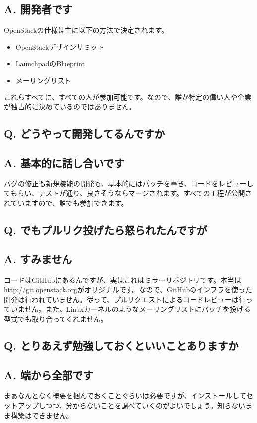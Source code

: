 \documentclass[9pt,b5paper,tombo,openany]{jsbook}
\begin{document}
\subsection*{{\LARGE\bfseries A.} 開発者です}
OpenStackの仕様は主に以下の方法で決定されます。
\begin{itemize}
	\item OpenStackデザインサミット
	\item LaunchpadのBlueprint
	\item メーリングリスト
\end{itemize}
これらすべてに、すべての人が参加可能です。なので、誰か特定の偉い人や企業が独占的に決めているのではありません。

\subsection*{{\LARGE\bfseries Q.} どうやって開発してるんですか}
\subsection*{{\LARGE\bfseries A.} 基本的に話し合いです}
バグの修正も新規機能の開発も、基本的にはパッチを書き、コードをレビューしてもらい、テストが通り、良さそうならマージされます。すべての工程が公開されていますので、誰でも参加できます。

\subsection*{{\LARGE\bfseries Q.} でもプルリク投げたら怒られたんですが}
\subsection*{{\LARGE\bfseries A.} すみません}
コードはGitHubにあるんですが、実はこれはミラーリポジトリです。本当は\url{http://git.openstack.org}がオリジナルです。なので、GitHubのインフラを使った開発は行われていません。従って、プルリクエストによるコードレビューは行っていません。また、Linuxカーネルのようなメーリングリストにパッチを投げる型式でも取り合ってくれません。

\subsection*{{\LARGE\bfseries Q.} とりあえず勉強しておくといいことありますか}
\subsection*{{\LARGE\bfseries A.} 端から全部です}
まぁなんとなく概要を掴んでおくことぐらいは必要ですが、インストールしてセットアップしつつ、分からないことを調べていくのがよいでしょう。知らないまま構築はできません。
\end{document}

